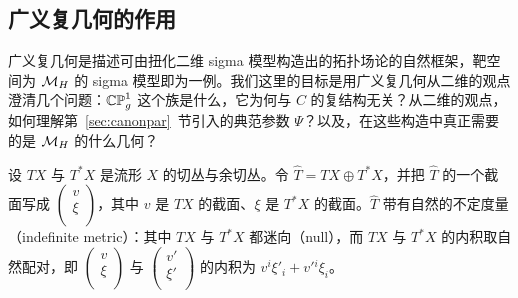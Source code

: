 \subsection{广义复几何的作用}

\label{sec:gencpx}

广义复几何是描述可由扭化二维 sigma 模型构造出的拓扑场论的自然框架，靶空间为 $\MH$ 的 sigma 模型即为一例。我们这里的目标是用广义复几何从二维的观点澄清几个问题：$\Bbb{CP}^1_g$ 这个族是什么，它为何与 $C$ 的复结构无关？从二维的观点，如何理解第~\ref{sec:canonpar}~节引入的典范参数 $\Psi$？以及，在这些构造中真正需要的是 $\MH$ 的什么几何？

设 $TX$ 与 $T^*X$ 是流形 $X$ 的切丛与余切丛。令 $\hat T=TX\oplus T^*X$，并把 $\hat T$ 的一个截面写成 $\left(\begin{matrix}v\\ \xi\\\end{matrix}\right)$，其中 $v$ 是 $TX$ 的截面、$\xi$ 是 $T^*X$ 的截面。$\hat T$ 带有自然的不定度量（indefinite metric）：其中 $TX$ 与 $T^*X$ 都迷向（null），而 $TX$ 与 $T^*X$ 的内积取自然配对，即 $\left(\begin{matrix}v\\ \xi\\\end{matrix}\right)$ 与 $\left(\begin{matrix}v'\\ \xi'\\\end{matrix}\right)$ 的内积为 $v^i\xi'_i+v'{}^i\xi_i$。

% 
% 
% 
% 
% 

